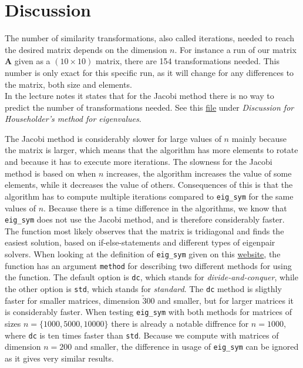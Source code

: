 \documentclass{article}
\begin{document}
\newpage

\vspace{1cm}

\section{Discussion} \label{sec:Discussion}

  The number of similarity transformations, also called iterations, needed to reach the desired matrix depends on the dimension $n$. For instance a run of our matrix \textbf{A} given as a $(10 \times 10)$ matrix, there are 154 transformations needed. This number is only exact for this specific run, as it will change for any differences to the matrix, both size and elements. \\

  In the lecture notes it states that for the Jacobi method there is no way to predict the number of transformations needed. See this \href{http://compphysics.github.io/ComputationalPhysics/doc/pub/eigvalues/html/eigvalues.html}{file} under \textit{Discussion for Householder's method for eigenvalues}.

  The Jacobi method is considerably slower for large values of $n$ mainly because the matrix is larger, which means that the algorithm has more elements to rotate and because it has to execute more iterations. The slowness for the Jacobi method is based on when $n$ increases, the algorithm increases the value of some elements, while it decreases the value of others. Consequences of this is that the algorithm has to compute multiple iterations compared to \texttt{eig\_sym} for the same values of $n$.
  Because there is a time difference in the algorithms, we know that \texttt{eig\_sym} does not use the Jacobi method, and is therefore considerably faster. The function most likely observes that the matrix is tridiagonal and finds the easiest solution, based on if-else-statements and different types of eigenpair solvers. When looking at the definition of \texttt{eig\_sym} given on this \href{http://arma.sourceforge.net/docs.html#eig_sym}{website}, the function has an argument \texttt{method} for describing two different methods for using the function. The default option is \texttt{dc}, which stands for \textit{divide-and-conquer}, while the other option is \texttt{std}, which stands for \textit{standard}. The \texttt{dc} method is sligthly faster for smaller matrices, dimension $\tilde 300$ and smaller, but for larger matrices it is considerably faster.
  When testing \texttt{eig\_sym} with both methods for matrices of sizes $n = \{ 1000, 5000, 10000\}$ there is already a notable diffrence for $n = 1000$, where \texttt{dc} is ten times faster than \texttt{std}. Because we compute with matrices of dimension $n = 200$ and smaller, the difference in usage of \texttt{eig\_sym} can be ignored as it gives very similar results. \\
\end{document}
